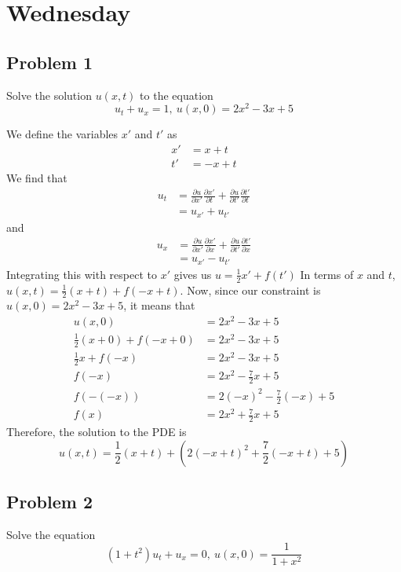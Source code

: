 \documentclass{ben}
\begin{document}
\section{Wednesday}
\subsection{Problem 1}
\noindent
Solve the solution $u(x, t)$ to the equation
\[
u_t + u_x = 1,\ u(x, 0) = 2x^2 - 3x + 5
\]
\begin{solution}
    We define the variables $x'$ and $t'$ as
    \begin{align*}
        x' &= x + t\\
        t' &= -x + t
    \end{align*}
    We find that
    \begin{align*}
        u_t &= \frac{\partial u}{\partial x'} \frac{\partial x'}{\partial t}
        + \frac{\partial u}{\partial t'} \frac{\partial t'}{\partial t}\\
        &= u_{x'} + u_{t'}
    \end{align*}
    and
    \begin{align*}
        u_x &= \frac{\partial u}{\partial x'} \frac{\partial x'}{\partial x}
        + \frac{\partial u}{\partial t'} \frac{\partial t'}{\partial x}\\
        &= u_{x'} - u_{t'}
    \end{align*}
    Integrating this with respect to $x'$ gives us $u = \frac{1}{2}x' + f(t')$
    In terms of $x$ and $t$, $u(x, t) = \frac{1}{2} \left( x + t \right) + f\left( -x + t \right)$.
    Now, since our constraint is $u(x, 0) = 2x^2 - 3x + 5$, it means that
    \begin{align*}
        u(x, 0) &= 2x^2 - 3x + 5\\
        \frac{1}{2}(x + 0) + f(-x + 0) &= 2x^2 - 3x + 5\\
        \frac{1}{2} x + f(-x) &= 2x^2 - 3x + 5\\
        f(-x) &= 2x^2 - \frac{7}{2}x + 5\\
        f(-(-x)) &= 2(-x)^2 - \frac{7}{2}(-x) + 5\\
        f(x) &= 2x^2 + \frac{7}{2}x + 5
    \end{align*}
    Therefore, the solution to the PDE is
    \[
        u(x, t) = \frac{1}{2}(x + t) + \left( 2 (-x + t)^2 + \frac{7}{2} (-x + t) + 5 \right)
    \]
\end{solution}
\subsection{Problem 2}
\noindent
Solve the equation
\[
(1 + t^2)u_t + u_x = 0,\ u(x, 0) = \frac{1}{1 + x^2}
\]
\end{document}
